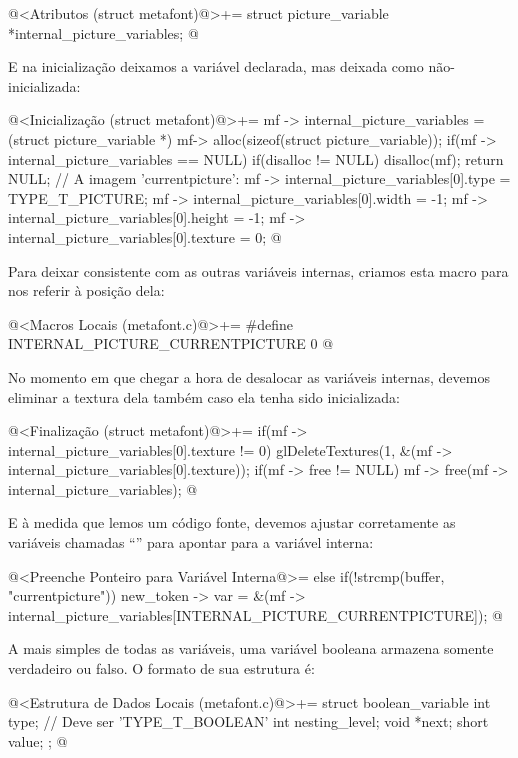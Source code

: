 \iniciocodigo
@<Atributos (struct metafont)@>+=
struct picture_variable *internal_picture_variables;
@
\fimcodigo

E na inicialização deixamos a variável 
declarada, mas deixada como não-inicializada:

\iniciocodigo
@<Inicialização (struct metafont)@>+=
mf -> internal_picture_variables = (struct picture_variable *)
                                   mf-> alloc(sizeof(struct picture_variable));
if(mf -> internal_picture_variables == NULL){
  if(disalloc != NULL)
    disalloc(mf);
  return NULL;
}
// A imagem 'currentpicture':
mf -> internal_picture_variables[0].type = TYPE_T_PICTURE;
mf -> internal_picture_variables[0].width = -1;
mf -> internal_picture_variables[0].height = -1;
mf -> internal_picture_variables[0].texture = 0;
@
\fimcodigo

Para deixar consistente com as outras variáveis internas, criamos esta
macro para nos referir à posição dela:

\iniciocodigo
@<Macros Locais (metafont.c)@>+=
#define INTERNAL_PICTURE_CURRENTPICTURE 0
@
\fimcodigo

No momento em que chegar a hora de desalocar as variáveis internas,
devemos eliminar a textura dela também caso ela tenha sido
inicializada:

\iniciocodigo
@<Finalização (struct metafont)@>+=
if(mf -> internal_picture_variables[0].texture != 0)
  glDeleteTextures(1, &(mf -> internal_picture_variables[0].texture));
if(mf -> free != NULL)
  mf -> free(mf -> internal_picture_variables);
@
\fimcodigo

E à medida que lemos um código fonte, devemos ajustar corretamente as
variáveis chamadas ``'' para apontar para a
variável interna:

\iniciocodigo
@<Preenche Ponteiro para Variável Interna@>=
else if(!strcmp(buffer, "currentpicture"))
  new_token -> var =
          &(mf -> internal_picture_variables[INTERNAL_PICTURE_CURRENTPICTURE]);
@
\fimcodigo


A mais simples de todas as variáveis, uma variável booleana armazena
somente verdadeiro ou falso. O formato de sua estrutura é:

\iniciocodigo
@<Estrutura de Dados Locais (metafont.c)@>+=
struct boolean_variable{
  int type; // Deve ser 'TYPE_T_BOOLEAN'
  int nesting_level;
  void *next;
  short value;
};
@
\fimcodigo


